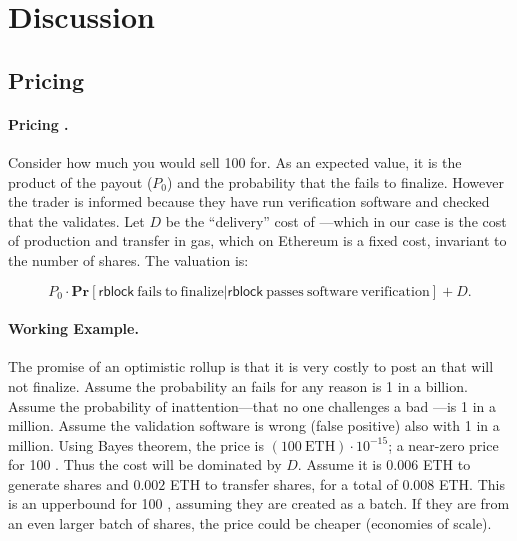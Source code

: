 
\section{Discussion}

\subsection{Pricing} 

\paragraph{Pricing \fail.}

Consider how much you would sell 100 \fail for. As an expected value, it is the product of the payout ($P_0$) and the probability that the \rblock fails to finalize. However the trader is informed because they have run verification software and checked that the \rblock validates. Let $D$ be the ``delivery'' cost of \fail---which in our case is the cost of production and transfer in \layerone gas, which on Ethereum is a fixed cost, invariant to the number of shares. The valuation is:

\[ P_0 \cdot \mathbf{Pr}[ \mathrm{\mathsf{rblock}~fails~to~finalize} |  \mathrm{\mathsf{rblock}~passes~software~verification} ] + D. \]

\paragraph{Working Example.} The promise of an optimistic rollup is that it is very costly to post an \rblock that will not finalize. Assume the probability an \rblock fails for any reason is 1 in a billion. Assume the probability of inattention---that no one challenges a bad \rblock---is 1 in a million. Assume the validation software is wrong (false positive) also with 1 in a million. Using Bayes theorem, the price is $(100 \mathrm{~ETH})\cdot10^{-15}$; a near-zero price for 100 \fail. Thus the cost will be dominated by $D$. Assume it is $0.006$ ETH to generate shares and $0.002$ ETH to transfer shares, for a total of $0.008$ ETH. This is an upperbound for 100 \fail, assuming they are created as a batch. If they are from an even larger batch of shares, the price could be cheaper (\ie economies of scale).



